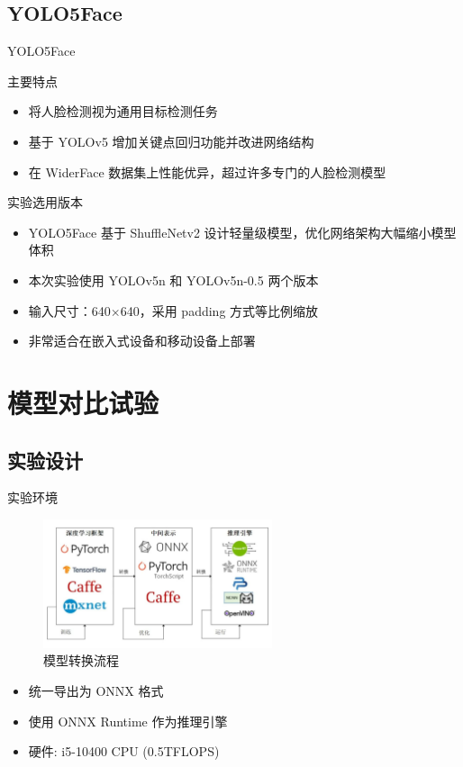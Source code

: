 \documentclass{beamer}
\begin{document}
\subsection{YOLO5Face}
\begin{frame}{YOLO5Face}
    \begin{block}{主要特点}
        \begin{itemize}
            \item 将人脸检测视为通用目标检测任务
            \item 基于 YOLOv5 增加关键点回归功能并改进网络结构
            \item 在 WiderFace 数据集上性能优异，超过许多专门的人脸检测模型
        \end{itemize}
    \end{block}
    
    \begin{block}{实验选用版本}
        \begin{itemize}
            \item YOLO5Face 基于 ShuffleNetv2 设计轻量级模型，优化网络架构大幅缩小模型体积
            \item 本次实验使用 YOLOv5n 和 YOLOv5n-0.5 两个版本
            \item 输入尺寸：640$\times$640，采用 padding 方式等比例缩放
            \item 非常适合在嵌入式设备和移动设备上部署
        \end{itemize}
    \end{block}
\end{frame}

\section{模型对比试验}

\subsection{实验设计}
\begin{frame}{实验环境}

    \begin{figure}[h]
        \centering
        \includegraphics[width=0.6\textwidth]{pic/pipeline.jpg}
        \caption{模型转换流程}
    \end{figure}

    \begin{itemize}
        \item 统一导出为 ONNX 格式
        \item 使用 ONNX Runtime 作为推理引擎
        \item 硬件: i5-10400 CPU (0.5TFLOPS)
    \end{itemize}
\end{frame}
\end{document}
